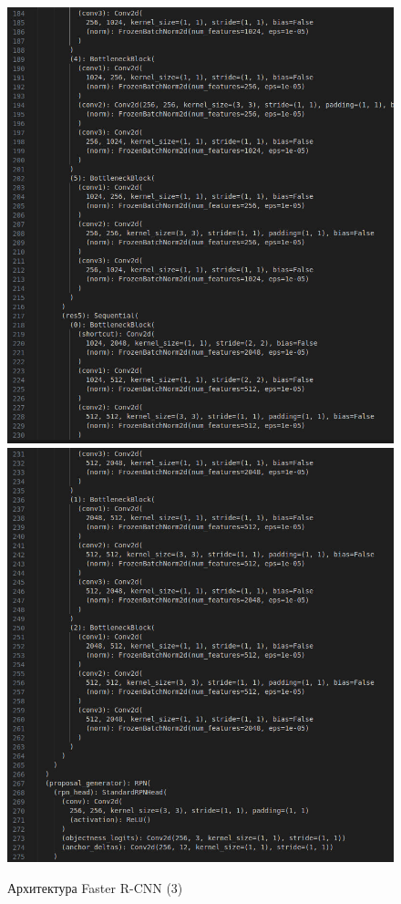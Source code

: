 \begin{figure}
	\includegraphics [scale=0.3]{my_folder/images/arch5}
	\includegraphics [scale=0.3]{my_folder/images/arch6}
	\label{fig:arch56}
	\caption{Архитектура Faster R-CNN (3)}
\end{figure}
